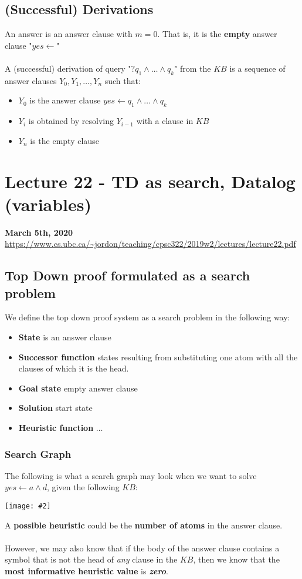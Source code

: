 \documentclass{article}
\def\blu#1{{\color{blu}#1}}
\newcommand{\centerfig}[2]{\begin{center}\texttt{[image: \#2]}\end{center}}
\begin{document}
\subsection*{(Successful) Derivations}
An \blu{answer} is an answer clause with $ m = 0 $. That is, it is the \textbf{empty} answer clause "$ yes \leftarrow $"\\
\\
A (successful) \blu{derivation} of query "$ ?q_1\land \dots \land q_k $" from the $ KB $ is a sequence of answer clauses $ Y_0, Y_1, \dots, Y_n $ such that:
\begin{itemize}
	\item $ Y_0 $ is the answer clause $ yes \leftarrow q_1\land \dots \land q_k $
	\item $ Y_i $ is obtained by \blu{resolving} $ Y_{i-1} $ with a clause in $ KB $
	\item $ Y_n $ is the empty clause
\end{itemize}

\newpage
\section*{Lecture 22 - TD as search, Datalog (variables)}
\textbf{March 5th, 2020}\\
\url{https://www.cs.ubc.ca/~jordon/teaching/cpsc322/2019w2/lectures/lecture22.pdf}
\subsection*{Top Down proof formulated as a search problem}
We define the top down proof system as a search problem in the following way:
\begin{itemize}
	\item \textbf{\blu{State}} is an answer clause
	\item \blu{\textbf{Successor function}} states resulting from substituting one atom with all the clauses of which it is the head.
	\item  \textbf{\blu{Goal state}} empty answer clause
	\item \textbf{\blu{Solution}} start state
	\item \blu{\textbf{Heuristic function}} $ \dots $
\end{itemize}
\subsubsection*{Search Graph}
The following is what a search graph may look when we want to solve $ yes \leftarrow a \land d $, given the following $ KB $:
\centerfig{0.8}{top-down-2}
A \textbf{possible heuristic} could be the \textbf{number of atoms} in the answer clause. \\
\\
However, we may also know that if the body of the answer clause contains a symbol that is not the head of \textit{any} clause in the $ KB $, then we know that the \blu{\textbf{most informative heuristic value}} is \textbf{\textit{zero}}.
\end{document}
